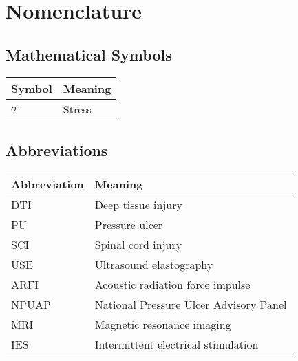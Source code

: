\chapter*{Nomenclature}
	\section*{Mathematical Symbols}
		\begin{longtable}[l]{ll}
			Symbol & Meaning \\
			\hline \endhead
			$\sigma$ & Stress \\
		\end{longtable}

	\section*{Abbreviations}
		\begin{longtable}[l]{ll}
			Abbreviation & Meaning \\
			\hline \endhead
			DTI & Deep tissue injury \\
			PU & Pressure ulcer \\
			SCI & Spinal cord injury \\
			USE & Ultrasound elastography \\
			ARFI & Acoustic radiation force impulse \\
			NPUAP & National Pressure Ulcer Advisory Panel \\
			MRI & Magnetic resonance imaging \\
			IES & Intermittent electrical stimulation \\
		\end{longtable}